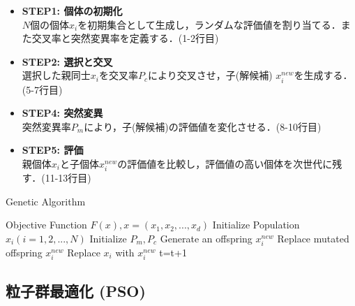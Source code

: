 \documentclass[a4j,11pt]{jarticle}
\begin{document}
\begin{itemize}
\item {\bf STEP1: 個体の初期化} \\
$N$個の個体$x_i$を初期集合として生成し，ランダムな評価値を割り当てる．また交叉率と突然変異率を定義する．(1-2行目)
\item {\bf STEP2: 選択と交叉} \\
選択した親同士$x_i$を交叉率$P_c$により交叉させ，子(解候補) $x_i^{new}$を生成する．(5-7行目)
\item {\bf STEP4: 突然変異} \\
突然変異率$P_m$により，子(解候補)の評価値を変化させる．(8-10行目)
\item {\bf STEP5: 評価} \\
親個体$x_i$と子個体$x_i^{new}$の評価値を比較し，評価値の高い個体を次世代に残す．(11-13行目)
\end{itemize}

\begin{algorithm}[H]
\caption{Genetic Algorithm}
\label{code:ga}
\begin{algorithmic}[1]
\REQUIRE Objective Function $F(x), x=(x_1,x_2,...,x_d)$
\STATE Initialize Population $x_i (i=1,2,...,N)$
\STATE Initialize $P_m, P_c$
\STATE Generate an offspring $x_i^{new}$ 
\ENDIF
{}
\STATE Replace mutated offspring $x_i^{new}$
\ENDIF
{}
\STATE Replace $x_i$ with $x_i^{new}$
\ENDIF
\ENDFOR
\STATE t=t+1
\ENDWHILE
\end{algorithmic}
\end{algorithm}


\subsection{粒子群最適化 (PSO)}
\label{ss:PSO}
  \makeatletter
  \renewcommand{\theequation}{\arabic{section}-\arabic{subsection}-\arabic{equation}}
  \makeatother
\end{document}
